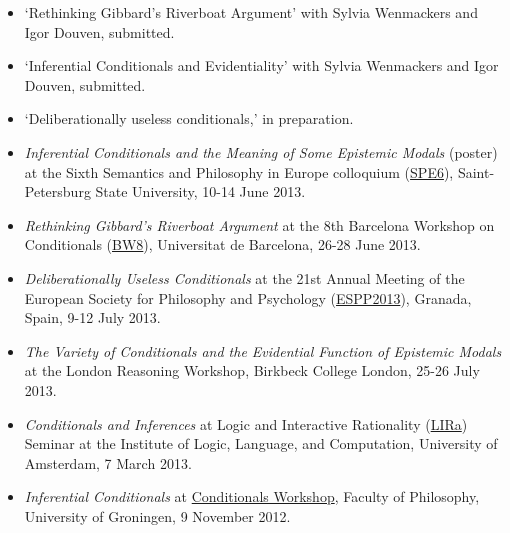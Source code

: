 \documentclass[a4paper,12pt]{article}
\begin{document}
\begin{small}
\begin{itemize}
  \end{itemize}

  \begin{itemize}
  \item `Rethinking Gibbard's Riverboat Argument' with Sylvia
    Wenmackers and Igor Douven, submitted.
  \item `Inferential Conditionals and Evidentiality' with Sylvia
    Wenmackers and Igor Douven, submitted.
  \item `Deliberationally useless conditionals,' in preparation.
  \end{itemize}




  \begin{itemize}
  \item \emph{Inferential Conditionals and the Meaning of Some
      Epistemic Modals} (poster) at the Sixth Semantics and Philosophy
    in Europe colloquium
    (\href{http://spe6conference.wordpress.com}{SPE6}),
    Saint-Petersburg State University, 10-14 June 2013.
  \item \emph{Rethinking Gibbard’s Riverboat Argument} at the 8th
    Barcelona Workshop on Conditionals
    (\href{http://www.ub.edu/logosbw/bw8/index.html}{BW8}),
    Universitat de Barcelona, 26-28 June 2013.
  \item \emph{Deliberationally Useless Conditionals} at the 21st
    Annual Meeting of the European Society for Philosophy and
    Psychology (\href{http://espp2013.com}{ESPP2013}), Granada, Spain,
    9-12 July 2013.
  \item \emph{The Variety of Conditionals and the Evidential Function
      of Epistemic Modals} at the London Reasoning Workshop, Birkbeck
    College London, 25-26 July 2013.
  \end{itemize}

  

  \begin{itemize}
  \item \emph{Conditionals and Inferences} at Logic and Interactive
    Rationality (\href{http://www.illc.uva.nl/lgc/seminar/}{LIRa}) Seminar at the Institute of Logic, Language, and
    Computation, University of Amsterdam, 7 March 2013.
  \item \emph{Inferential Conditionals} at \href{https://sites.google.com/site/jannekehuitink/workshop}{Conditionals Workshop},
    Faculty of Philosophy, University of Groningen, 9 November 2012.
  \end{itemize}
  

\end{small}
\end{document}
